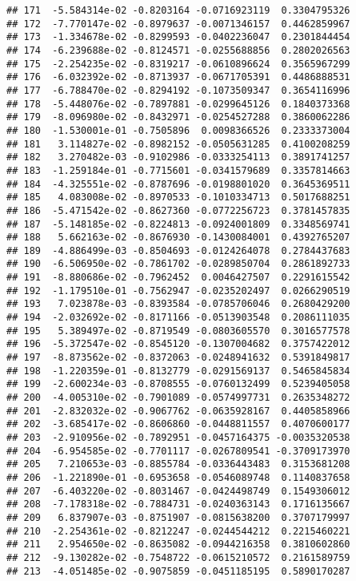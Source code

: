 \documentclass[
]{article}
\begin{document}
\begin{verbatim}
## 171  -5.584314e-02 -0.8203164 -0.0716923119  0.3304795326
## 172  -7.770147e-02 -0.8979637 -0.0071346157  0.4462859967
## 173  -1.334678e-02 -0.8299593 -0.0402236047  0.2301844454
## 174  -6.239688e-02 -0.8124571 -0.0255688856  0.2802026563
## 175  -2.254235e-02 -0.8319217 -0.0610896624  0.3565967299
## 176  -6.032392e-02 -0.8713937 -0.0671705391  0.4486888531
## 177  -6.788470e-02 -0.8294192 -0.1073509347  0.3654116996
## 178  -5.448076e-02 -0.7897881 -0.0299645126  0.1840373368
## 179  -8.096980e-02 -0.8432971 -0.0254527288  0.3860062286
## 180  -1.530001e-01 -0.7505896  0.0098366526  0.2333373004
## 181   3.114827e-02 -0.8982152 -0.0505631285  0.4100208259
## 182   3.270482e-03 -0.9102986 -0.0333254113  0.3891741257
## 183  -1.259184e-01 -0.7715601 -0.0341579689  0.3357814663
## 184  -4.325551e-02 -0.8787696 -0.0198801020  0.3645369511
## 185   4.083008e-02 -0.8970533 -0.1010334713  0.5017688251
## 186  -5.471542e-02 -0.8627360 -0.0772256723  0.3781457835
## 187  -5.148185e-02 -0.8224813 -0.0924001809  0.3348569741
## 188   5.662163e-02 -0.8676930 -0.1430084001  0.4392765207
## 189  -4.886499e-03 -0.8504693 -0.0124264078  0.2784437683
## 190  -6.506950e-02 -0.7861702 -0.0289850704  0.2861892733
## 191  -8.880686e-02 -0.7962452  0.0046427507  0.2291615542
## 192  -1.179510e-01 -0.7562947 -0.0235202497  0.0266290519
## 193   7.023878e-03 -0.8393584 -0.0785706046  0.2680429200
## 194  -2.032692e-02 -0.8171166 -0.0513903548  0.2086111035
## 195   5.389497e-02 -0.8719549 -0.0803605570  0.3016577578
## 196  -5.372547e-02 -0.8545120 -0.1307004682  0.3757422012
## 197  -8.873562e-02 -0.8372063 -0.0248941632  0.5391849817
## 198  -1.220359e-01 -0.8132779 -0.0291569137  0.5465845834
## 199  -2.600234e-03 -0.8708555 -0.0760132499  0.5239405058
## 200  -4.005310e-02 -0.7901089 -0.0574997731  0.2635348272
## 201  -2.832032e-02 -0.9067762 -0.0635928167  0.4405858966
## 202  -3.685417e-02 -0.8606860 -0.0448811557  0.4070600177
## 203  -2.910956e-02 -0.7892951 -0.0457164375 -0.0035320538
## 204  -6.954585e-02 -0.7701117 -0.0267809541 -0.3709173970
## 205   7.210653e-03 -0.8855784 -0.0336443483  0.3153681208
## 206  -1.221890e-01 -0.6953658 -0.0546089748  0.1140837658
## 207  -6.403220e-02 -0.8031467 -0.0424498749  0.1549306012
## 208  -7.178318e-02 -0.7884731 -0.0240363143  0.1716135667
## 209   6.837907e-03 -0.8751907 -0.0815638200  0.3707179997
## 210  -2.254361e-02 -0.8212247 -0.0244544212  0.2215460221
## 211   2.954650e-02 -0.8635082 -0.0944216358  0.3810602860
## 212  -9.130282e-02 -0.7548722 -0.0615210572  0.2161589759
## 213  -4.051485e-02 -0.9075859 -0.0451185195  0.5890170287

\end{verbatim}
\end{document}
